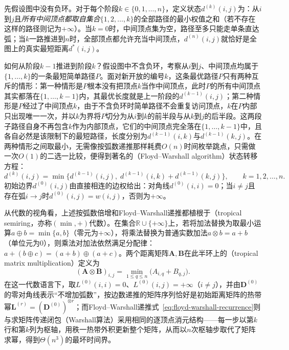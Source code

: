 先假设图中没有负环。对于每个阶段$k\in\{0,1,\ldots,n\}$，定义状态$d^{(k)}(i,j)$为：从$i$到$j$且\emph{所有中间顶点都取自集合$\{1,2,\ldots,k\}$}的全部路径的最小权值之和（若不存在这样的路径则记为$+\infty$）。当$k=0$时，中间顶点集为空，路径至多只能走单条直达弧；当$k$一路推进到$n$时，全部顶点都允许充当中间顶点，$d^{(n)}(i,j)$就恰好是全图上的真实最短距离$d^*(i,j)$。

如何从阶段$k-1$推进到阶段$k$？假设图中不含负环，考察从$i$到$j$、中间顶点均属于$\{1,\ldots,k\}$的一条最短简单路径$P$。面对新开放的编号$k$，这条最优路径$P$只有两种互斥的情形：第一种情形是$P$根本没有把顶点$k$当作中间顶点，此时$P$的所有中间顶点其实都落在$\{1,\ldots,k-1\}$内，其最优长度就是上一阶段的$d^{(k-1)}(i,j)$；第二种情形是$P$经过了中间顶点$k$，由于不含负环时简单路径不会重复访问顶点，$k$在$P$内部只出现唯一一次，并以$k$为界将$P$切分为从$i$到$k$的前半段与从$k$到$j$的后半段。这两段子路径自身不再包含$k$作为内部顶点，它们的中间顶点完全落在$\{1,\ldots,k-1\}$中，且各自必然是该限制下的最短路径，长度分别为$d^{(k-1)}(i,k)$与$d^{(k-1)}(k,j)$。在两种情形之间取最小，无需像按弧数递推那样耗费$O(n)$时间枚举跳点，只需做一次$O(1)$的二选一比较，便得到著名的（Floyd--Warshall algorithm）状态转移方程：
\begin{equation}
  d^{(k)}(i,j) = \min\bigl\{d^{(k-1)}(i,j),\; d^{(k-1)}(i,k) + d^{(k-1)}(k,j)\bigr\},\qquad k=1,2,\ldots,n.
  \label{eq:floyd-warshall-recurrence}
\end{equation}
初始边界$d^{(0)}(i,j)$由直接相连的边权给出：对角线$d^{(0)}(i,i)=0$；当$i\neq j$且存在弧$i\to j$时$d^{(0)}(i,j)=w(i,j)$，否则为$+\infty$。

从代数的视角看，上述按弧数倍增和Floyd--Warshall递推都植根于（tropical semiring，亦称$(\min,+)$代数）。在集合$\mathbb R\cup\{+\infty\}$上，若将加法替换为取最小运算$a\oplus b=\min\{a,b\}$（零元为$+\infty$），将乘法替换为普通实数加法$a\otimes b=a+b$（单位元为$0$），则乘法对加法依然满足分配律：$a+(b\oplus c)=(a+b)\oplus(a+c)$。两个距离矩阵$\bm A,\bm B$在此半环上的（tropical matrix multiplication）定义为
\begin{equation}
  (\bm A\otimes\bm B)_{i,j} = \min_{1\leq q\leq n}\bigl(A_{i,q}+B_{q,j}\bigr).
  \label{eq:tropical-matrix-mult}
\end{equation}
在这一代数语言下，取$L^{(0)}(i,i)=0$、$L^{(0)}(i,j)=+\infty$（$i\ne j$），并由$\bm D^{(0)}$的零对角线表示“不增加弧数”，按边数递推的矩阵序列恰好是初始距离矩阵的热带幂$\bm L^{(r)}=(\bm D^{(0)})^{\otimes r}$；而Floyd--Warshall递推式~\eqref{eq:floyd-warshall-recurrence}则与求矩阵传递闭包（Warshall算法）采用相同的逐顶点消元结构——每一步以第$k$行和第$k$列为枢轴，用秩一热带外积更新整个矩阵，从而以$n$次枢轴步取代了矩阵求幂，得到$\Theta(n^3)$的最坏时间界。

